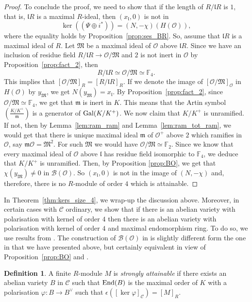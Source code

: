 \documentclass[11pt]{amsart}
\newcommand\F{\mathbb{F}}
\def\End{\mathop{\rm End}\nolimits}
\def\Gal{\mathop{\rm Gal}\nolimits}
\newcommand\cB{\mathcal{B}}
\newcommand\cC{\mathcal{C}}
\newcommand\cO{\mathcal{O}}
\newcommand\frl{\mathfrak{l}}
\newcommand\frm{\mathfrak{m}}
\newcommand\frM{\mathfrak{M}}
\theoremstyle{plain}
\theoremstyle{definition}
\newtheorem{definition}[theorem]{Definition}
\begin{document}
\begin{proof}
    To conclude the proof, we need to show that if the length of $R/\frl R$ is $1$, that is, $\frl R$ is a maximal $R$-ideal, then $(x_\frl,0)$ is not in 
    \[ \ker((\Psi \oplus i^*)) = (N,-\chi)(H(\cO)), \] 
    where the equality holds by Proposition~\ref{prop:ses_BR}.
    So, assume that $\frl R$ is a maximal ideal of $R$.
    Let $\frM $ be a maximal ideal of $\cO$ above $\frl R$.
    Since we have an inclusion of residue field $R/\frl R\to \cO/\frM$ and $2$ is not inert in $\cO$ 
    by Proposition~\ref{prop:fact_2}, then 
    \[ R/\frl R \simeq \cO/\frM \simeq \F_4. \]
    This implies that $[\cO/\frM]_R = [R/\frl R]_R$.
    If we denote the image of $[\cO/\frM]_{\cO}$ in $H(\cO)$ by $y_\frM$, we get $N(y_\frM) = x_\frl$. 
    By Proposition~\ref{prop:fact_2}, since $\cO/\frM\simeq\F_4$, we get that $\frm$ is inert in $K$.
    This means that the Artin symbol $\left(\frac{K/K^+}{\frm}\right)$ is a generator of $\Gal(K/K^+)$.
    We now claim that $K/K^+$ is unramified.
    If not, then by Lemma~\ref{lem:ram_ram} and Lemma~\ref{lem:ram_tot_ram}, we would get that there is unique maximal ideal $\frm$ of $\cO^+$ above $2$ which ramifies in $\cO$, say $\frm\cO = \frM^2$. 
    For such $\frM$ we would have $\cO/\frM\simeq \F_2$.
    Since we know that every maximal ideal of $\cO$ above $\frl$ has residue field isomorphic to $\F_4$, we deduce that $K/K^+$ is unramified.
    Then, by Proposition \ref{prop:BO}, we get that $\chi(y_\frM)\neq 0$ in $\cB(\cO)$.
    So $(x_\frl,0)$ is not in the image of $(N,-\chi)$ and, therefore, there is no $R$-module of order $4$ which is attainable.
\end{proof}

\smallskip

In Theorem~\ref{thm:kers_size_4}, we wrap-up the discussion above.
Moreover, in certain cases with $\cC$ ordinary, we show that if there is an abelian variety with polarisation with kernel of order $4$ then there is an abelian variety with polarisation with kernel of order $4$ and maximal endomorphism ring.
To do so, we use results from \cite{Howe95}. 
The construction of $\cB(\cO)$ in \cite{Howe95} is slightly different form the one in \cite{Howe96} that we have presented above, but certainly equivalent in view of Proposition~\ref{prop:BO} and \cite[Prop.~10.1]{Howe95}.

\begin{definition}
    A finite $R$-module $M$ is \emph{strongly attainable} 
    if there exists an abelian variety $B$ in $\cC$ such that $\End(B)$ is the maximal order of $K$ with a polarisation $\varphi:B\to B^\vee$ such that $\epsilon([\ker\varphi]_\cC) = [M]_R$.
\end{definition}
\end{document}
